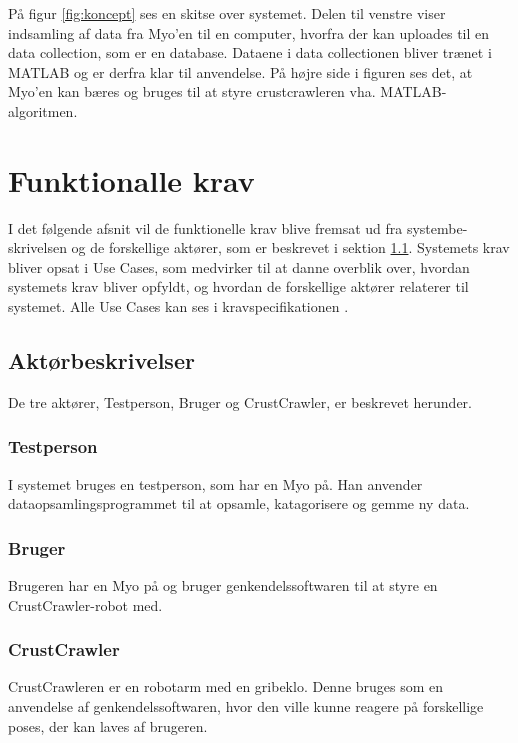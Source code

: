 På figur \ref{fig:koncept} ses en skitse over systemet. Delen til venstre viser indsamling af data fra Myo'en til en computer, hvorfra der kan uploades til en data collection, som er en database.  Dataene i data collectionen bliver trænet i MATLAB og er derfra klar til anvendelse. På højre side i figuren ses det, at Myo'en kan bæres og bruges til at styre crustcrawleren vha. MATLAB-algoritmen.


\thispagestyle{fancy}
\section{Funktionalle krav}
\label{sec:funktionellekrav}
I det følgende afsnit vil de funktionelle krav blive fremsat ud fra systembe- skrivelsen og de forskellige aktører, som er beskrevet i sektion \ref{sec:aktorbeskrivelser}.
Systemets krav bliver opsat i Use Cases, som medvirker til at danne overblik over, hvordan systemets krav bliver opfyldt, og hvordan de forskellige aktører relaterer til systemet. Alle Use Cases kan ses i kravspecifikationen \citep{RefWorks:8}.

\subsection{Aktørbeskrivelser}
\label{sec:aktorbeskrivelser}
De tre aktører, Testperson, Bruger og CrustCrawler, er beskrevet herunder.

\subsubsection{Testperson}
I systemet bruges en testperson, som har en Myo på. Han anvender dataopsamlingsprogrammet til at opsamle, katagorisere og gemme ny data.

\subsubsection{Bruger}
Brugeren har en Myo på og bruger genkendelssoftwaren til at styre en CrustCrawler-robot med.

\subsubsection{CrustCrawler}
CrustCrawleren er en robotarm med en gribeklo. Denne bruges som en anvendelse af genkendelssoftwaren, hvor den ville kunne reagere på forskellige poses, der kan laves af brugeren.

